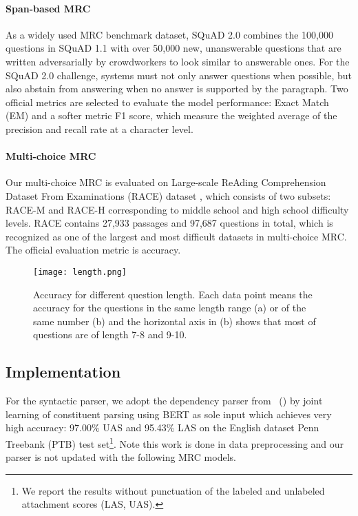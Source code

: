 \documentclass[letterpaper]{article} \usepackage{color}
\begin{document}
\paragraph{Span-based MRC} As a widely used MRC benchmark dataset, SQuAD 2.0  \cite{Rajpurkar2018Know} combines the 100,000 questions in SQuAD 1.1 \cite{Rajpurkar2016SQuAD} with over 50,000 new, unanswerable questions that are written adversarially by crowdworkers to look similar to answerable ones. For the SQuAD 2.0 challenge, systems must not only answer questions when possible, but also abstain from answering when no answer is supported by the paragraph. Two official metrics are selected to evaluate the model performance: Exact Match (EM) and a softer metric F1 score, which measure the weighted average of the precision and recall rate at a character level.

\paragraph{Multi-choice MRC}
Our multi-choice MRC is evaluated on Large-scale ReAding Comprehension Dataset From Examinations (RACE) dataset \cite{lai2017race}, which consists of two subsets: RACE-M and RACE-H corresponding to middle school and high school difficulty levels. RACE contains 27,933 passages and 97,687 questions in total, which is recognized as one of the largest and most difficult datasets in multi-choice MRC. The official evaluation metric is accuracy.

\begin{figure*}
	\centering
	\texttt{[image: length.png]}
	\caption{\label{fig:length} Accuracy for different question length. Each data point means the accuracy for the questions in the same length range (a) or of the same number (b) and the horizontal axis in (b) shows that most of questions are of length 7-8 and 9-10.}
\end{figure*}


\subsection{Implementation} 
\label{imp}
For the syntactic parser, we adopt the dependency parser from \citeauthor{zhou2019head}~(\citeyear{zhou2019head}) by joint learning of  constituent parsing \cite{Kitaev-2018-SelfAttentive} using BERT as sole input which achieves very high accuracy: 97.00\% UAS and 95.43\% LAS on the English dataset Penn Treebank (PTB) \cite{MarcusJ93-2004} test set\footnote{We report the results without punctuation of the labeled and unlabeled attachment scores (LAS, UAS).}. Note this work is done in data preprocessing and our parser is not updated with the following MRC models.
\end{document}
